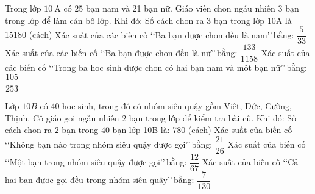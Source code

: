 \begin{ex} %
	Trong lớp $10 \mathrm{~A}$ có 25 bạn nam và 21 bạn nữ. Giáo viên chon ngẫu nhiên 3 bạn trong lớp để làm cán bô lớp. Khi đó:
	\choiceTF
	{\True Số cách chon ra 3 bạn trong lớp 10A là 15180 (cách)}
	{\True Xác suất của các biến cố \lq\lq Ba bạn được chon đều là nam\rq\rq\,bằng: $\dfrac{5}{33}$}
	{Xác suất của các biến cố \lq\lq Ba bạn được chon đều là nữ\rq\rq\,bằng: $\dfrac{133}{1158}$}
	{\True Xác suất của các biến cố \lq\lq Trong ba hoc sinh được chon có hai bạn nam và môt bạn nữ\rq\rq\,bằng: $\dfrac{105}{253}$}
\end{ex}
\begin{ex}%
	Lớp $10 B$ có 40 hoc sinh, trong đó có nhóm siêu quậy gồm Viêt, Đức, Cường, Thịnh. Cô giáo goi ngẫu nhiên 2 bạn trong lớp để kiểm tra bài cũ. Khi đó:
	\choiceTF
	{\True Số cách chon ra 2 bạn trong 40 bạn lớp 10B là: 780 (cách)}
	{\True Xác suất của biến cố \lq\lq Không bạn nào trong nhóm siêu quậy được gọi\rq\rq\,bằng: $\dfrac{21}{26}$}
	{Xác suất của biến cố \lq\lq Một bạn trong nhóm siêu quậy được gọi\rq\rq\,bằng: $\dfrac{12}{67}$}
	{Xác suất của biến cố \lq\lq Cả hai bạn đươc gọi đều trong nhóm siêu quậy\rq\rq\,bằng: $\dfrac{7}{130}$}
\end{ex}
